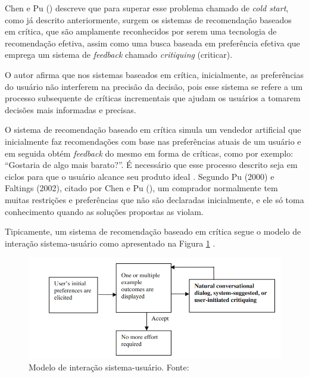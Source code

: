 Chen e Pu (\citeyear{Chen:2012}) descreve que para superar esse problema chamado de \textit{cold start}, como já descrito anteriormente, surgem os sistemas de recomendação baseados em crítica, que são amplamente reconhecidos por serem uma tecnologia de recomendação efetiva, assim como uma busca baseada em preferência efetiva que emprega um sistema de \textit{feedback} chamado \textit{critiquing} (criticar).

O autor afirma que nos sistemas baseados em crítica, inicialmente, as preferências do usuário não interferem na precisão da decisão, pois esse sistema se refere a um processo subsequente de críticas incrementais que ajudam os usuários a tomarem decisões mais informadas e precisas.

O sistema de recomendação baseado em crítica simula um vendedor artificial que inicialmente faz recomendações com base nas preferências atuais de um usuário e em seguida obtém \textit{feedback} do mesmo em forma de críticas, como por exemplo: “Gostaria de algo mais barato?”. É necessário que esse processo descrito seja em ciclos para que o usuário alcance seu produto ideal \cite{Chen:2012}. Segundo Pu (2000) e Faltings (2002), citado por Chen e Pu (\citeyear{Chen:2012}), um comprador normalmente tem muitas restrições e preferências que não são declaradas inicialmente, e ele só toma conhecimento quando as soluções propostas as violam.

Tipicamente, um sistema de recomendação baseado em crítica segue o modelo de interação sistema-usuário como apresentado na Figura \ref{fig:sistema_usuario} \cite{Chen:2012}.

\begin{figure}[H]
    \centering
    \includegraphics[scale=0.45]{figuras/referencial_teorico/sistema_usuario.png}
    \caption[Modelo de interação sistema-usuário]{Modelo de interação sistema-usuário. Fonte: \cite{Chen:2012}}
    \label{fig:sistema_usuario}
\end{figure}

